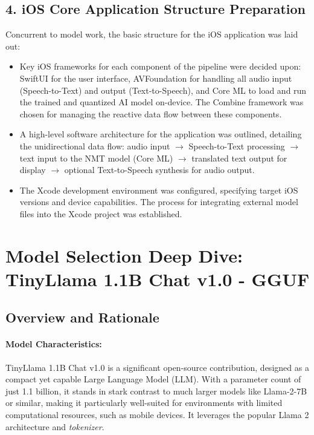 \documentclass[12pt]{article}
\begin{document}
\subsection*{4. iOS Core Application Structure Preparation}
Concurrent to model work, the basic structure for the iOS application was laid out:
\begin{itemize}
    \item Key iOS frameworks for each component of the pipeline were decided upon: SwiftUI for the user interface, AVFoundation for handling all audio input (Speech-to-Text) and output (Text-to-Speech), and Core ML to load and run the trained and quantized AI model on-device. The Combine framework was chosen for managing the reactive data flow between these components.
    \item A high-level software architecture for the application was outlined, detailing the unidirectional data flow: audio input $\rightarrow$ Speech-to-Text processing $\rightarrow$ text input to the NMT model (Core ML) $\rightarrow$ translated text output for display $\rightarrow$ optional Text-to-Speech synthesis for audio output.
    \item The Xcode development environment was configured, specifying target iOS versions and device capabilities. The process for integrating external model files into the Xcode project was established.
\end{itemize}

\section{Model Selection Deep Dive: TinyLlama 1.1B Chat v1.0 - GGUF}

\subsection{Overview and Rationale}

\paragraph{Model Characteristics:}
TinyLlama 1.1B Chat v1.0 is a significant open-source contribution, designed as a compact yet capable Large Language Model (LLM). With a parameter count of just 1.1 billion, it stands in stark contrast to much larger models like Llama-2-7B or similar, making it particularly well-suited for environments with limited computational resources, such as mobile devices. It leverages the popular Llama 2 architecture and \emph{tokenizer}.
\end{document}
